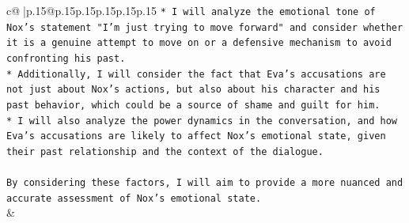 \documentclass{article}
\begin{document}
{\begin{supertabular}{c@{$\;$}|p{.15\linewidth}@{}p{.15\linewidth}p{.15\linewidth}p{.15\linewidth}p{.15\linewidth}p{.15\linewidth}}
{{{\texttt{* I will analyze the emotional tone of Nox's statement "I'm just trying to move forward" and consider whether it is a genuine attempt to move on or a defensive mechanism to avoid confronting his past.} \\
\texttt{* Additionally, I will consider the fact that Eva's accusations are not just about Nox's actions, but also about his character and his past behavior, which could be a source of shame and guilt for him.} \\
\texttt{* I will also analyze the power dynamics in the conversation, and how Eva's accusations are likely to affect Nox's emotional state, given their past relationship and the context of the dialogue.} \\
\\ 
\texttt{By considering these factors, I will aim to provide a more nuanced and accurate assessment of Nox's emotional state.} \\
            }
        }
    }
    & \\ \\

\end{supertabular}
}
\end{document}
